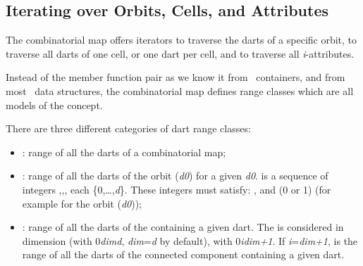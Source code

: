 \subsection{Iterating over Orbits, Cells, and Attributes}\label{ssec-range}

The combinatorial map offers iterators to traverse the darts
of a specific orbit, to traverse all darts of one cell, or
one dart per cell, and to traverse all \emph{i}-attributes.

Instead of the  member function pair as we know it
from \stl\ containers, and from most \cgal\ data structures, the
combinatorial map defines range classes which are all models of the
 concept.

There are three different categories of dart range classes:
\begin{itemize}
\item {}: range of all the darts of a combinatorial map;
\item {}: range of all the darts of
  the orbit (\emph{d0}) for a given \emph{d0}.   is a
  sequence of integers 
  ,\myldots{},, 
  each \myin{}\{0,\ldots,\emph{d}\}. 
  These integers must satisfy:
  \mylt{}\mylt{}\myldots{}\mylt{},
  and (\myneq{}0 or \myneq{}1) 
  (for example  for the orbit
  \orbit{\betaun{},\betadeux{}}(\emph{d0}));	
\item {}: range of all the darts of
  the  containing a given dart. The  is considered in
  dimension  (with 0\myleq{}\emph{dim}\myleq{}\emph{d}, 
  \emph{dim}=\emph{d} by default), 
  with 0\myleq{}\emph{i}\myleq{}\emph{dim+1}. If \emph{i}=\emph{dim+1},
   is the range of all the darts of
  the connected component containing a given dart.
\end{itemize}

